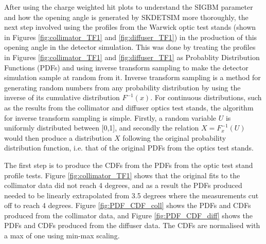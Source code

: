 After using the charge weighted hit plots to understand the SIGBM parameter and how the opening angle is generated by SKDETSIM more thoroughly, the next step involved using the profiles from the Warwick optic test stands (shown in Figures \ref{fig:collimator_TF1} and \ref{fig:diffuser_TF1}) in the production of this opening angle in the detector simulation. This was done by treating the profiles in Figures \ref{fig:collimator_TF1} and \ref{fig:diffuser_TF1} as Probablity Distribution Functions (PDFs) and using inverse transform sampling to make the detector simulation sample at random from it. Inverse transform sampling is a method for generating random numbers from any probability distribution by using the inverse of its cumulative distribution $F^{-1}(x)$. For continuous distributions, such as the results from the collimator and diffuser optics test stands, the algorithm for inverse transform sampling is simple. Firstly, a random variable $U$ is uniformly distributed between [0,1], and secondly the relation $X = F^{-1}_{x}(U)$ would then produce a distribution $X$ following the original probability distribution function, i.e. that of the original PDFs from the optics test stands. 

The first step is to produce the CDFs from the PDFs from the optic test stand profile tests. Figure \ref{fig:collimator_TF1} shows that the original fits to the collimator data did not reach 4 degrees, and as a result the PDFs produced needed to be linearly extrapolated from 3.5 degrees where the measurements cut off to reach 4 degrees. Figure \ref{fig:PDF_CDF_coll} shows the PDFs and CDFs produced from the collimator data, and Figure \ref{fig:PDF_CDF_diff} shows the PDFs and CDFs produced from the diffuser data. The CDFs are normalised with a max of one using min-max scaling.

